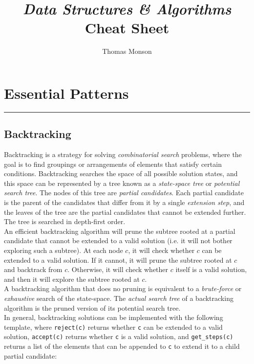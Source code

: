 \documentclass[12pt, titlepage]{article}
\title{\textit{Data Structures \& Algorithms} Cheat Sheet}
\author{Thomas Monson}
\date{}
\begin{document}
\maketitle

\tableofcontents
\newpage

\section{Essential Patterns}
\hrule\vspace{5ex}

\subsection{Backtracking}

Backtracking is a strategy for solving \textit{combinatorial search} problems, where the goal is to find groupings or arrangements of elements that satisfy certain conditions. Backtracking searches the space of all possible solution states, and this space can be represented by a tree known as a \textit{state-space tree} or \textit{potential search tree}. The nodes of this tree are \textit{partial candidates}. Each partial candidate is the parent of the candidates that differ from it by a single \textit{extension step}, and the leaves of the tree are the partial candidates that cannot be extended further. The tree is searched in depth-first order. \\

An efficient backtracking algorithm will prune the subtree rooted at a partial candidate that cannot be extended to a valid solution (i.e. it will not bother exploring such a subtree). At each node $c$, it will check whether $c$ can be extended to a valid solution. If it cannot, it will prune the subtree rooted at $c$ and backtrack from $c$. Otherwise, it will check whether $c$ itself is a valid solution, and then it will explore the subtree rooted at $c$. \\

A backtracking algorithm that does no pruning is equivalent to a \textit{brute-force} or \textit{exhaustive} search of the state-space. The \textit{actual search tree} of a backtracking algorithm is the pruned version of its potential search tree. \\

In general, backtracking solutions can be implemented with the following template, where \texttt{reject(c)} returns whether \texttt{c} can be extended to a valid solution, \texttt{accept(c)} returns whether \texttt{c} is a valid solution, and \texttt{get\_steps(c)} returns a list of the elements that can be appended to \texttt{c} to extend it to a child partial candidate: \medskip
\end{document}
